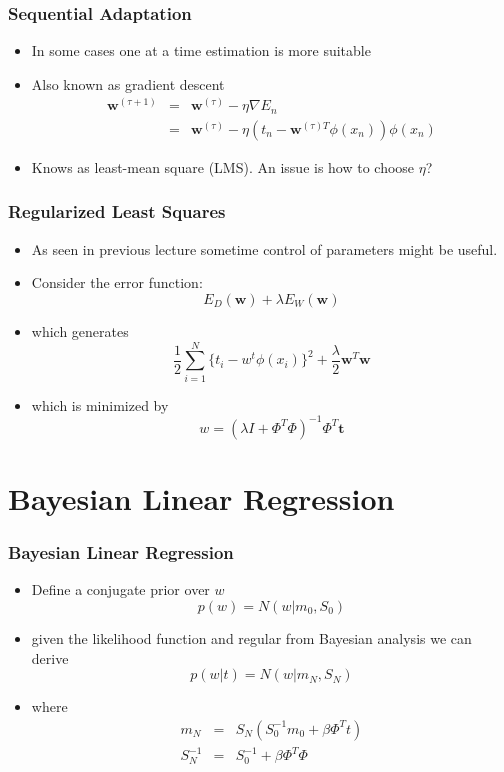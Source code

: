 \documentclass[10pt]{beamer}
\begin{document}
\begin{frame}
  \frametitle{Sequential Adaptation}
  \begin{itemize}
  \item In some cases one at a time estimation is more suitable
  \item Also known as gradient descent
    \begin{eqnarray*}
      {\mathbf w}^{(\tau+1)} &=& {\mathbf w}^{(\tau)} - \eta \nabla E_n\\
                             &=& {\mathbf w}^{(\tau)} - \eta (t_n -
                             {\mathbf w}^{(\tau)T} \phi(x_n))
                             \phi(x_n)
    \end{eqnarray*}
  \item Knows as least-mean square (LMS). An issue is how to choose
    $\eta$?
  \end{itemize}
\end{frame}

\begin{frame}
  \frametitle{Regularized Least Squares}
  \begin{itemize}
  \item As seen in previous lecture sometime control of parameters might be
    useful.
  \item Consider the error function:
    \[
    E_D({\mathbf w}) + \lambda E_W({\mathbf w})
    \]
  \item which generates
    \[
    \frac{1}{2}\sum_{i=1}^N \{ t_i - w^t\phi(x_i)\}^2 +
    \frac{\lambda}{2} {\mathbf w}^T{\mathbf w}
    \]
  \item which is minimized by 
    \[
    w = \left( \lambda I + \Phi^T \Phi \right)^{-1} \Phi^T {\mathbf t}
    \]
  \end{itemize}
\end{frame}


\section[Bayes Regress]{Bayesian Linear Regression}

\begin{frame}
  \frametitle{Bayesian Linear Regression}
  \begin{itemize}
  \item Define a conjugate prior over $w$
    \[
    p(w) = N(w|m_0,S_0)
    \]
  \item given the likelihood function and regular from Bayesian
    analysis we can derive
    \[
    p(w|t) = N(w|m_N, S_N)
    \]
  \item where
    \begin{eqnarray*}
      m_N & = & S_N\left(S_0^{-1}m_0+ \beta \Phi^T t\right) \\
      S_N^{-1} & = & S_0^{-1} + \beta \Phi^T \Phi
    \end{eqnarray*}
  \end{itemize}
\end{frame}
\end{document}
